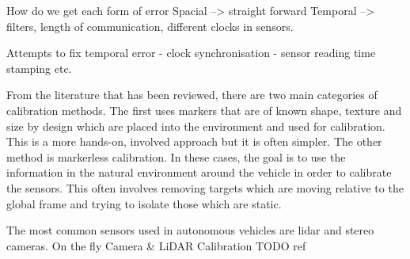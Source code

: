 How do we get each form of error
Spacial --> straight forward
Temporal --> filters, length of communication, different clocks in sensors.


Attempts to fix temporal error
- clock synchronisation
- sensor reading time stamping 
etc. 


From the literature that has been reviewed, there are two main categories of calibration methods. The first uses markers that are of known shape, texture and size by design which are placed into the environment and used for calibration. This is a more hands-on, involved approach but it is often simpler. 
The other method is markerless calibration. In these cases, the goal is to use the information in the natural environment around the vehicle in order to calibrate the sensors. This often involves removing targets which are moving relative to the global frame and trying to isolate those which are static. 

The most common sensors used in autonomous vehicles are lidar and stereo cameras. 
On the fly Camera \& LiDAR Calibration
TODO ref





